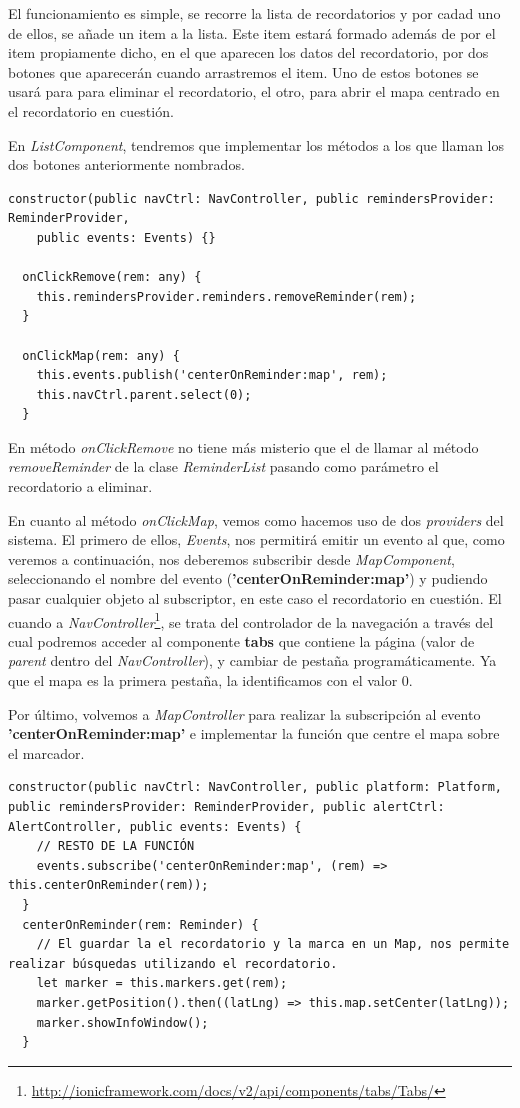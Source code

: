 El funcionamiento es simple, se recorre la lista de recordatorios y por cadad uno de ellos, se añade un item a la lista. Este item estará formado además de por el item propiamente dicho, en el que aparecen los datos del recordatorio, por dos botones que aparecerán cuando arrastremos el item. Uno de estos botones se usará para para eliminar el recordatorio, el otro, para abrir el mapa centrado en el recordatorio en cuestión.

En \emph{ListComponent}, tendremos que implementar los métodos a los que llaman los dos botones anteriormente nombrados.

\begin{lstlisting}[style=htmlcssjs,frame=tlrb,xleftmargin={0.2cm}]
  constructor(public navCtrl: NavController, public remindersProvider: ReminderProvider,
    public events: Events) {}

  onClickRemove(rem: any) {
    this.remindersProvider.reminders.removeReminder(rem);
  }

  onClickMap(rem: any) {
    this.events.publish('centerOnReminder:map', rem);
    this.navCtrl.parent.select(0);
  }
\end{lstlisting}

En método \emph{onClickRemove{}} no tiene más misterio que el de llamar al método \emph{removeReminder} de la clase \emph{ReminderList} pasando como parámetro el recordatorio a eliminar.

En cuanto al método \emph{onClickMap}, vemos como hacemos uso de dos \emph{providers} del sistema. El primero de ellos, \emph{Events}, nos permitirá emitir un evento al que, como veremos a continuación, nos deberemos subscribir desde \emph{MapComponent}, seleccionando el nombre del evento (\textbf{'centerOnReminder:map'}) y pudiendo pasar cualquier objeto al subscriptor, en este caso el recordatorio en cuestión. El cuando a \emph{NavController}\footnote{\url{http://ionicframework.com/docs/v2/api/components/tabs/Tabs/}}, se trata del controlador de la navegación a través del cual podremos acceder al componente \textbf{tabs} que contiene la página (valor de \emph{parent} dentro del \emph{NavController}), y cambiar de pestaña programáticamente. Ya que el mapa es la primera pestaña, la identificamos con el valor 0.

Por último, volvemos a \emph{MapController} para realizar la subscripción al evento \textbf{'centerOnReminder:map'} e implementar la función que centre el mapa sobre el marcador.

\begin{lstlisting}[style=htmlcssjs,frame=tlrb,xleftmargin={0.2cm}]
  constructor(public navCtrl: NavController, public platform: Platform, public remindersProvider: ReminderProvider, public alertCtrl: AlertController, public events: Events) {
    // RESTO DE LA FUNCIÓN
    events.subscribe('centerOnReminder:map', (rem) => this.centerOnReminder(rem));
  }
  centerOnReminder(rem: Reminder) {
    // El guardar la el recordatorio y la marca en un Map, nos permite realizar búsquedas utilizando el recordatorio.
    let marker = this.markers.get(rem);
    marker.getPosition().then((latLng) => this.map.setCenter(latLng));
    marker.showInfoWindow();
  }
\end{lstlisting}

